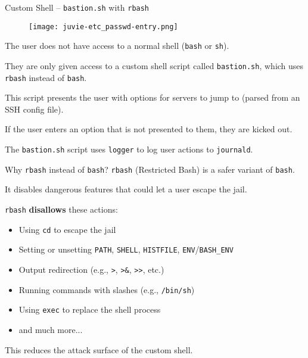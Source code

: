 \documentclass[14pt,compress,dvipsnames,aspectratio=169]{beamer} %
\begin{document}
\begin{frame}{Custom Shell -- \texttt{bastion.sh} with \texttt{rbash}}
    \begin{figure}
        \centering
        \texttt{[image: juvie-etc\_passwd-entry.png]}
    \end{figure}
    The user does not have access to a normal shell (\texttt{bash} or \texttt{sh}).
    \vspace{0.25cm}

    They are only given access to a custom shell script called \texttt{bastion.sh},
    which uses \texttt{rbash} instead of \texttt{bash}.
    \vspace{0.25cm}

    This script presents the user with options for servers to jump to (parsed from an
    SSH config file).  
    \vspace{0.25cm}

    If the user enters an option that is not presented to them, they are kicked out.  
    \vspace{0.25cm}

    The \texttt{bastion.sh} script uses \texttt{logger} to log user actions to
    \texttt{journald}.  
\end{frame}


\begin{frame}{Why \texttt{rbash} instead of \texttt{bash}?}
    \texttt{rbash} (Restricted Bash) is a safer variant of \texttt{bash}.  

    It disables dangerous features that could let a user escape the jail.  
    \vspace{0.25cm}

    \texttt{rbash} \textbf{disallows} these actions:
    \vspace{0.25cm}
    \begin{itemize}
        \item{Using \texttt{cd} to escape the jail} 
        \item{Setting or unsetting \texttt{PATH}, \texttt{SHELL}, \texttt{HISTFILE}, \texttt{ENV}/\texttt{BASH\_ENV} }
        \item{Output redirection (e.g., \texttt{>}, \texttt{>\&}, \texttt{>>}, etc.)} 
        \item{Running commands with slashes (e.g., \texttt{/bin/sh})} 
        \item{Using \texttt{exec} to replace the shell process} 
        \item{and much more...} 
    \end{itemize}
    \vspace{0.15cm}
    This reduces the attack surface of the custom shell.  
\end{frame}
\end{document}
